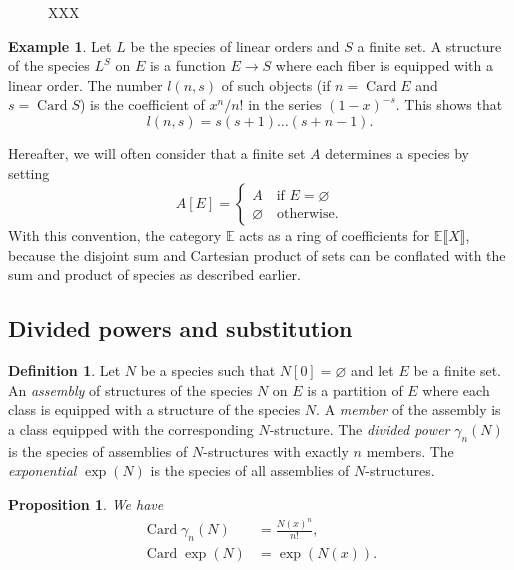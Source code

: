 \documentclass{amsart}
\newtheorem{prop}[thm]{Proposition}
\theoremstyle{definition}
\newtheorem{defn}[thm]{Definition}
\newtheorem{ex}{Example}
\theoremstyle{remark}
\newcommand{\E}{\mathbb{E}}
\DeclareMathOperator{\Card}{Card}
\newcommand{\Poly}[2]{#1 \llbracket #2 \rrbracket}
\newcommand{\term}[1]{\emph{#1}}
\begin{document}
\begin{figure}
  \centering
  \caption{XXX}
  \label{fig:vertebrate}
\end{figure}

\begin{ex}
  Let $L$ be the species of linear orders and $S$ a finite set.  A
  structure of the species $L^S$ on $E$ is a function $E \to S$ where
  each fiber is equipped with a linear order. The number $l(n, s)$ of
  such objects (if $n = \Card E$ and $s = \Card S$) is the coefficient
  of $x^n/n!$ in the series $(1-x)^{-s}$. This shows that
  \[ l(n, s) = s (s + 1) \dots (s + n-1). \]
\end{ex}

Hereafter, we will often consider that a finite set $A$
determines a species by setting
\[ A [E] = \begin{cases} A \quad \text{if $E = \varnothing$} \\ \varnothing \quad \text{otherwise}. \end{cases} \]
With this convention, the category $\E$ acts as a ring of coefficients
for $\Poly \E X$, because the disjoint sum and Cartesian product of sets
can be conflated with the sum and product of species as described
earlier.

\subsection{Divided powers and substitution}

\begin{defn}
  Let $N$ be a species such that $N [0] = \varnothing$ and let $E$ be
  a finite set. An \term{assembly} of structures of the species $N$ on
  $E$ is a partition of $E$ where each class is equipped with a
  structure of the species $N$.  A \term{member} of the assembly is a
  class equipped with the corresponding $N$-structure. The
  \term{divided power} $\gamma_n(N)$ is the species of assemblies of
  $N$-structures with exactly $n$ members. The \term{exponential}
  $\exp (N)$ is the species of all assemblies of $N$-structures.
\end{defn}

\begin{prop}
We have
\begin{align*}
\Card \gamma_n(N) &= \frac{N(x)^n}{n!}, \\
\Card \exp (N) &= \exp (N (x)).
\end{align*}
\end{prop}
\end{document}

